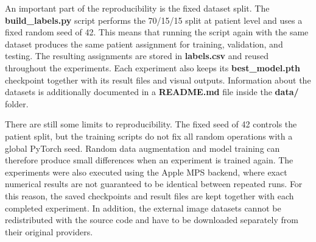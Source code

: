 An important part of the reproducibility is the fixed dataset split. The \textbf{build\_labels.py} script performs the 70/15/15 split at patient level and uses a fixed random seed of 42. This means that running the script again with the same dataset produces the same patient assignment for training, validation, and testing. The resulting assignments are stored in \textbf{labels.csv} and reused throughout the experiments. Each experiment also keeps its \textbf{best\_model.pth} checkpoint together with its result files and visual outputs. Information about the datasets is additionally documented in a \textbf{README.md} file inside the \textbf{data/} folder. 

There are still some limits to reproducibility. The fixed seed of 42 controls the patient split, but the training scripts do not fix all random operations with a global PyTorch seed. Random data augmentation and model training can therefore produce small differences when an experiment is trained again. The experiments were also executed using the Apple MPS backend, where exact numerical results are not guaranteed to be identical between repeated runs. For this reason, the saved checkpoints and result files are kept together with each completed experiment. In addition, the external image datasets cannot be redistributed with the source code and have to be downloaded separately from their original providers.



















